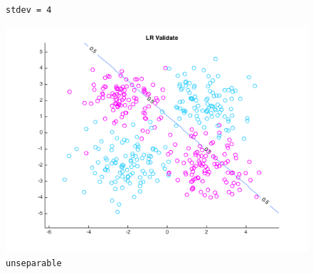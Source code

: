 \documentclass[10pt,letterpaper]{article}
\begin{document}
\begin{figure}[!htb]
  \caption{\texttt{stdev = 4}}\label{fig:gradDifS}
\endminipage\hfill
{}
  \includegraphics[width=\linewidth]{figures/sdnv0.png}
  \caption{\texttt{unseparable}}\label{fig:gradDifS}
\endminipage

\end{figure}
\end{document}
